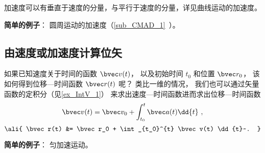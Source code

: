 加速度可以有垂直于速度的分量，与平行于速度的分量，详见曲线运动的加速度。

\textbf{简单的例子}： 圆周运动的加速度（\autoref{sub_CMAD_1}~）。

\subsection{由速度或加速度计算位矢}

如果已知速度关于时间的函数 $\bvec v(t)$， 以及初始时间 $t_0$ 和位置 $\bvec r_0$， 该如何得到位移—时间函数 $\bvec r(t)$ 呢？ 类比一维的情况， 我们也可以通过矢量函数的定积分（见\autoref{ex_IntV_1}） 来求出速度—时间函数进而求出位移—时间函数
\begin{equation}\label{eq_VnA_7}
\bvec v(t) = \bvec v_0 + \int_{t_0}^{t} \bvec a(t) \dd{t}~,
\end{equation}
\begin{equation}\label{eq_VnA_8}\ali{
\bvec r(t) &= \bvec r_0 + \int_{t_0}^{t} \bvec v(t) \dd{t}~.
}\end{equation}

\textbf{简单的例子}： 匀加速运动。
